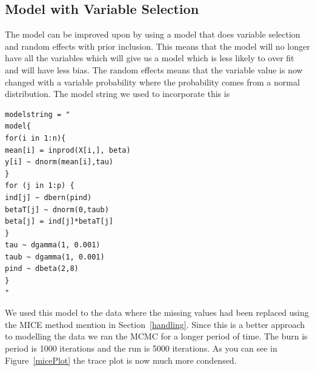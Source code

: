 \documentclass{article}
\begin{document}
\subsection{Model with Variable Selection}
The model can be improved upon by using a model that does variable selection and random effects with prior inclusion. This means that the model will no longer have all the variables which will give us a model which is less likely to over fit and will have less bias. The random effects means that the variable value is now changed with a variable probability where the probability comes from a normal distribution. The model string we used to incorporate this is
\begin{verbatim}
modelstring = "
model{
for(i in 1:n){
mean[i] = inprod(X[i,], beta)
y[i] ~ dnorm(mean[i],tau)
}
for (j in 1:p) {
ind[j] ~ dbern(pind)
betaT[j] ~ dnorm(0,taub)
beta[j] = ind[j]*betaT[j]
}
tau ~ dgamma(1, 0.001)
taub ~ dgamma(1, 0.001)
pind ~ dbeta(2,8)
}
"
\end{verbatim}
We used this model to the data where the missing values had been replaced using the MICE method mention in Section~\ref{handling}. Since this is a better approach to modelling the data we ran the MCMC for a longer period of time. The burn is period is 1000 iterations and the run is 5000 iterations. As you can see in Figure~\ref{micePlot} the trace plot is now much more condensed. 
\end{document}
